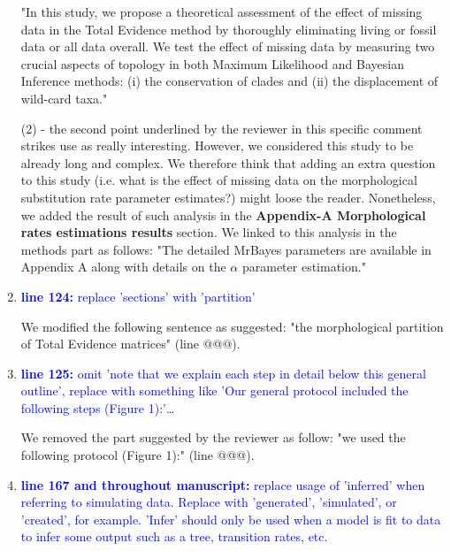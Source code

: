\documentclass[12pt,letterpaper]{article}
\begin{document}
\begin{enumerate}
"In this study, we propose a theoretical assessment of the effect of missing data in the Total Evidence method by thoroughly eliminating living or fossil data or all data overall. We test the effect of missing data by measuring two crucial aspects of topology in both Maximum Likelihood and Bayesian Inference methods: (i) the conservation of clades and (ii) the displacement of wild-card taxa."

(2) - the second point underlined by the reviewer in this specific comment strikes use as really interesting. However, we considered this study to be already long and complex. We therefore think that adding an extra question to this study (i.e. what is the effect of missing data on the morphological substitution rate parameter estimates?) might loose the reader.
Nonetheless, we added the result of such analysis in the \textbf{Appendix-A Morphological rates estimations results} section.
We linked to this analysis in the methods part as follows:
"The detailed MrBayes parameters are available in Appendix A along with details on the $\alpha$ parameter estimation."


\item{\textcolor{blue}{\textbf{line 124:} replace 'sections' with 'partition'}}

We modified the following sentence as suggested: "the morphological partition of Total Evidence matrices" (line @@@).

\item{\textcolor{blue}{\textbf{line 125:} omit 'note that we explain each step in detail below this general outline', replace with something like 'Our general protocol included the following steps (Figure 1):'…}}

We removed the part suggested by the reviewer as follow: "we used the following protocol (Figure 1):" (line @@@).

\item{\textcolor{blue}{\textbf{line 167 and throughout manuscript:} replace usage of 'inferred' when referring to simulating data. Replace with 'generated', 'simulated', or 'created', for example. 'Infer' should only be used when a model is fit to data to infer some output such as a tree, transition rates, etc. }}


\end{enumerate}
\end{document}
